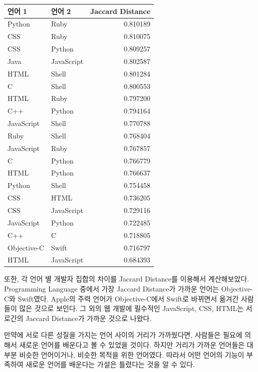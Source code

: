 \documentclass[10pt, a4paper, titlepage]{article}
\begin{document}
\begin{center}
\begin{tabular} {|l|l|r|}
\hline
\rowcolor[gray]{0.8}
언어 1 & 언어 2 & Jaccard Distance \\
\hline

Python & 
Ruby & 
0.810189 \\ \hline
CSS & 
Ruby & 
0.810075 \\ \hline
CSS & 
Python & 
0.809257 \\ \hline
Java & 
JavaScript & 
0.802587 \\ \hline
HTML & 
Shell & 
0.801284 \\ \hline
C & 
Shell & 
0.800553 \\ \hline
HTML & 
Ruby & 
0.797200 \\ \hline
C++ & 
Python & 
0.794164 \\ \hline
JavaScript & 
Shell & 
0.770788 \\ \hline
Ruby & 
Shell & 
0.768404 \\ \hline
JavaScript & 
Ruby & 
0.767857 \\ \hline
C & 
Python & 
0.766779 \\ \hline
HTML & 
Python & 
0.766637 \\ \hline
Python & 
Shell & 
0.754458 \\ \hline
CSS & 
HTML & 
0.736205 \\ \hline
CSS & 
JavaScript & 
0.729116 \\ \hline
JavaScript & 
Python & 
0.722485 \\ \hline
C++ & 
C & 
0.718805 \\ \hline
Objective-C & 
Swift & 
0.716797 \\ \hline
HTML & 
JavaScript & 
0.684393 \\ \hline
\end{tabular}
\end{center}

또한, 각 언어 별 개발자 집합의 차이를 Jaccard Distance\cite{r11}를 이용해서 계산해보았다. Programming Language 중에서 가장 Jaccard Distance가 가까운 언어는 Objective-C와 Swift였다. Apple의 주력 언어가 Objective-C에서 Swift로 바뀌면서 옮겨간 사람들이 많은 것으로 보인다. 그 외의 웹 개발에 필수적인 JavaScript, CSS, HTML는 서로간의 Jaccard Distance가 가까운 것으로 나왔다.

만약에 서로 다른 성질을 가지는 언어 사이의 거리가 가까웠다면, 사람들은 필요에 의해서 새로운 언어를 배운다고 볼 수 있었을 것이다. 하지만 거리가 가까운 언어들은 대부분 비슷한 언어이거나, 비슷한 목적을 위한 언어였다. 따라서 어떤 언어의 기능이 부족하여 새로운 언어를 배운다는 가설은 틀렸다는 것을 알 수 있다.
\end{document}
